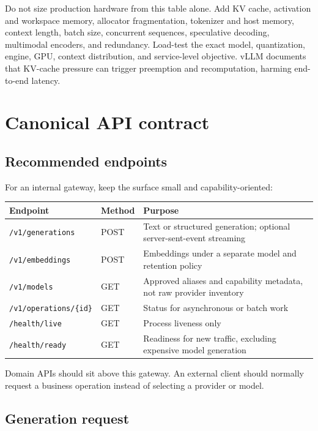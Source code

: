 \documentclass[10pt]{article}
\newcommand{\code}[1]{\texttt{#1}}
\begin{document}
Do not size production hardware from this table alone. Add KV cache, activation and workspace memory, allocator fragmentation, tokenizer and host memory, context length, batch size, concurrent sequences, speculative decoding, multimodal encoders, and redundancy. Load-test the exact model, quantization, engine, GPU, context distribution, and service-level objective. vLLM documents that KV-cache pressure can trigger preemption and recomputation, harming end-to-end latency.\cite{vllm-opt,vllm-kv}

\section{Canonical API contract}

\subsection{Recommended endpoints}

For an internal gateway, keep the surface small and capability-oriented:

\noindent\begin{tabularx}{\textwidth}{P{0.26\textwidth} P{0.17\textwidth} Y}
\toprule
\textbf{Endpoint} & \textbf{Method} & \textbf{Purpose} \\
\midrule
\code{/v1/generations} & POST & Text or structured generation; optional server-sent-event streaming \\
\code{/v1/embeddings} & POST & Embeddings under a separate model and retention policy \\
\code{/v1/models} & GET & Approved aliases and capability metadata, not raw provider inventory \\
\code{/v1/operations/\{id\}} & GET & Status for asynchronous or batch work \\
\code{/health/live} & GET & Process liveness only \\
\code{/health/ready} & GET & Readiness for new traffic, excluding expensive model generation \\
\bottomrule
\end{tabularx}

Domain APIs should sit above this gateway. An external client should normally request a business operation instead of selecting a provider or model.

\subsection{Generation request}
\end{document}
